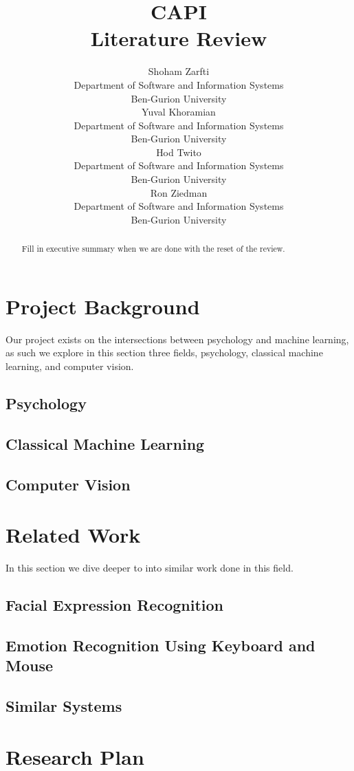 \documentclass{article}
\title{CAPI \\ Literature Review}
\author{
  Shoham Zarfti \\
  Department of Software and Information Systems \\
  Ben-Gurion University \\
   \And
 Yuval Khoramian \\
  Department of Software and Information Systems\\
  Ben-Gurion University \\
  \And
 Hod Twito \\
  Department of Software and Information Systems\\
  Ben-Gurion University \\
  \And
 Ron Ziedman \\
  Department of Software and Information Systems\\
  Ben-Gurion University \\
}
\begin{document}
\maketitle
\begin{abstract}
Fill in executive summary when we are done with the reset of the review.
\end{abstract}



\section{Project Background}
Our project exists on the intersections between psychology and machine learning, as such we explore in this section three fields, psychology, classical machine learning, and computer vision.

\subsection{Psychology}



\subsection{Classical Machine Learning}



\subsection{Computer Vision}



\section{Related Work}
In this section we dive deeper to into similar work done in this field.

\subsection{Facial Expression Recognition}


\subsection{Emotion Recognition Using Keyboard and Mouse}



\subsection{Similar Systems}



\section{Research Plan}




  

\end{document}
